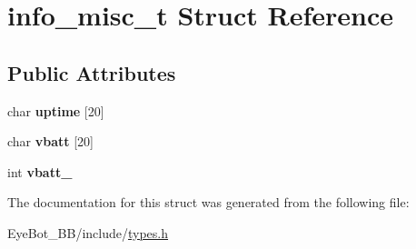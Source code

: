 \hypertarget{structinfo__misc__t}{\section{info\-\_\-misc\-\_\-t \-Struct \-Reference}
\label{structinfo__misc__t}
}
\subsection*{\-Public \-Attributes}
\begin{DoxyCompactItemize}
\item 
\hypertarget{structinfo__misc__t_af080b392d281ce280ed9ed64c47d8366}{char {\bfseries uptime} \mbox{[}20\mbox{]}}\label{structinfo__misc__t_af080b392d281ce280ed9ed64c47d8366}

\item 
\hypertarget{structinfo__misc__t_ae647133f5fe4ebc73614a6c58999894f}{char {\bfseries vbatt} \mbox{[}20\mbox{]}}\label{structinfo__misc__t_ae647133f5fe4ebc73614a6c58999894f}

\item 
\hypertarget{structinfo__misc__t_a2c61f44322c9ccbf0c18437c1e38d3f1}{int {\bfseries vbatt\-\_}}\label{structinfo__misc__t_a2c61f44322c9ccbf0c18437c1e38d3f1}

\end{DoxyCompactItemize}


\-The documentation for this struct was generated from the following file\-:\begin{DoxyCompactItemize}
\item 
\-Eye\-Bot\-\_\-\-B\-B/include/\hyperlink{types_8h}{types.\-h}\end{DoxyCompactItemize}
